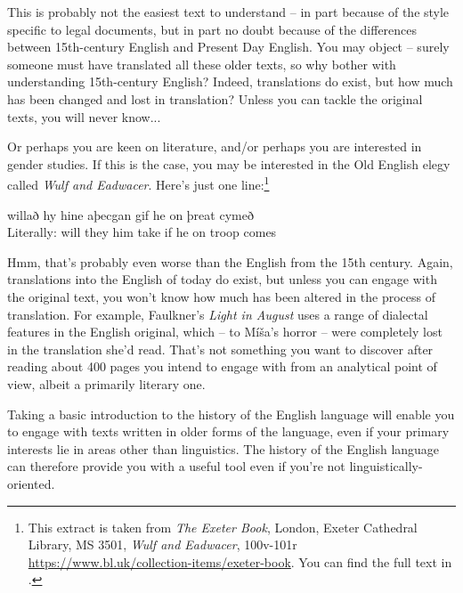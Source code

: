 \noindent This is probably not the easiest text to understand -- in part because of the style specific to legal documents, but in part no doubt because of the differences between 15th-century English and Present Day English. You may object -- surely someone must have translated all these older texts, so why bother with understanding 15th-century English? Indeed, translations do exist, but how much has been changed and lost in translation? Unless you can tackle the original texts, you will never know...

Or perhaps you are keen on literature, and/or perhaps you are interested in gender studies. If this is the case, you may be interested in the Old English elegy called \textit{Wulf and Eadwacer}. Here's just one line:\footnote{This extract is taken from \textit{The Exeter Book}, London, Exeter Cathedral Library, MS 3501, \emph{Wulf and Eadwacer}, 100v-101r \url{https://www.bl.uk/collection-items/exeter-book}. You can find the full text in .}

\begin{exe}
    \ex willað hy hine aþecgan gif he on þreat cymeð\\
    Literally: will they him take if he on troop comes
\end{exe}

\noindent Hmm, that's probably even worse than the English from the 15th century. Again, translations into the English of today do exist, but unless you can engage with the original text, you won't know how much has been altered in the process of translation. For example, Faulkner's \emph{Light in August} uses a range of dialectal features in the English original, which -- to Míša's horror -- were completely lost in the  translation she'd read. That's not something you want to discover after reading about 400 pages you intend to engage with from an analytical point of view, albeit a primarily literary one.

Taking a basic introduction to the history of the English language will enable you to engage with texts written in older forms of the language, even if your primary interests lie in areas other than linguistics. The history of the English language can therefore provide you with a useful tool even if you're not linguistically-oriented.

